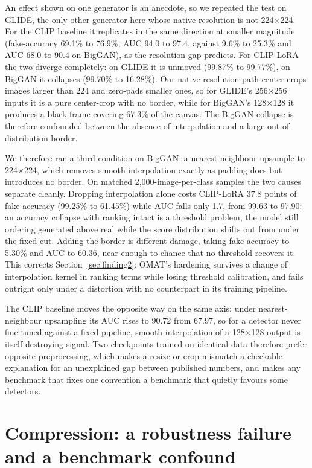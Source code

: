 \documentclass[3p,times,procedia]{elsarticle}
\begin{document}
An effect shown on one generator is an anecdote, so we repeated the test
on GLIDE, the only other generator here whose native resolution is not
224$\times$224. For the CLIP baseline it replicates in the same direction
at smaller magnitude (fake-accuracy 69.1\% to 76.9\%, AUC 94.0 to 97.4,
against 9.6\% to 25.3\% and AUC 68.0 to 90.4 on BigGAN), as the resolution
gap predicts. For CLIP-LoRA the two diverge completely: on GLIDE it is
unmoved (99.87\% to 99.77\%), on BigGAN it collapses (99.70\% to 16.28\%).
Our native-resolution path center-crops images larger than 224 and
zero-pads smaller ones, so for GLIDE's 256$\times$256 inputs it is a pure
center-crop with no border, while for BigGAN's 128$\times$128 it produces
a black frame covering 67.3\% of the canvas. The BigGAN collapse is
therefore confounded between the absence of interpolation and a large
out-of-distribution border.

We therefore ran a third condition on BigGAN: a nearest-neighbour upsample
to 224$\times$224, which removes smooth interpolation exactly as padding
does but introduces no border. On matched 2{,}000-image-per-class samples
the two causes separate cleanly. Dropping interpolation alone costs
CLIP-LoRA 37.8 points of fake-accuracy (99.25\% to 61.45\%) while AUC
falls only 1.7, from 99.63 to 97.90: an accuracy collapse with ranking
intact is a threshold problem, the model still ordering generated above
real while the score distribution shifts out from under the fixed cut.
Adding the border is different damage, taking fake-accuracy to 5.30\% and
AUC to 60.36, near enough to chance that no threshold recovers it. This
corrects Section~\ref{sec:finding2}: OMAT's hardening survives a change of
interpolation kernel in ranking terms while losing threshold calibration,
and fails outright only under a distortion with no counterpart in its
training pipeline.

The CLIP baseline moves the opposite way on the same axis: under
nearest-neighbour upsampling its AUC rises to 90.72 from 67.97, so for a
detector never fine-tuned against a fixed pipeline, smooth interpolation
of a 128$\times$128 output is itself destroying signal. Two checkpoints
trained on identical data therefore prefer opposite preprocessing, which
makes a resize or crop mismatch a checkable explanation for an unexplained
gap between published numbers, and makes any benchmark that fixes one
convention a benchmark that quietly favours some detectors.

\section{Compression: a robustness failure and a benchmark confound}
\label{sec:compression}
\end{document}
